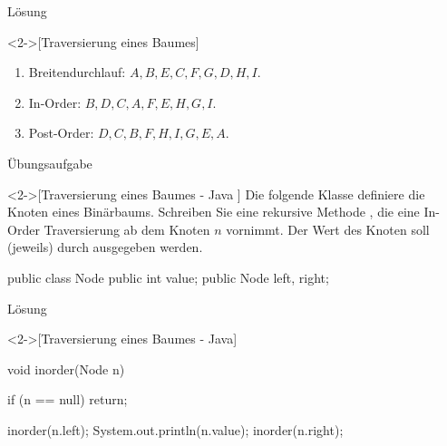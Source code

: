 \begin{frame}[c]{Lösung}
    \begin{solve}<2->[Traversierung eines Baumes]
        \begin{center}
        \end{center}
        \begin{enumerate}[<+(1)->]
            \item Breitendurchlauf: \(A,B,E,C,F,G,D,H,I\).
            \item In-Order: \(B,D,C,A,F,E,H,G,I\).
            \item Post-Order: \(D,C,B,F,H,I,G,E,A\).
        \end{enumerate}
    \end{solve}
\end{frame}

\begin{frame}[fragile,c]{Übungsaufgabe}
    \begin{exercise}<2->[Traversierung eines Baumes - Java ]
        Die folgende Klasse definiere die Knoten eines Binärbaums.\pause{} Schreiben Sie eine rekursive Methode , die eine In-Order Traversierung ab dem Knoten \(n\) vornimmt.\pause{} Der Wert des Knoten soll (jeweils) durch  ausgegeben werden.\pause{}
\begin{plainjava}
public class Node {
    public int value;
    public Node left, right;
}
\end{plainjava}
    \end{exercise}
\end{frame}

\begin{frame}[fragile,c]{Lösung}
    \begin{solve}<2->[Traversierung eines Baumes - Java]
\pause{}\begin{plainjava}
void inorder(Node n)  {
    if (n == null) return;

    inorder(n.left);
    System.out.println(n.value);
    inorder(n.right);
}
\end{plainjava}
    \end{solve}
\end{frame}

